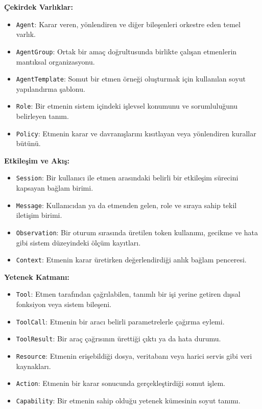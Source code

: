 \documentclass[10pt, a4paper, twocolumn]{article}
\begin{document}
\textbf{Çekirdek Varlıklar:}
\begin{itemize}
    \item \texttt{Agent}: Karar veren, yönlendiren ve diğer bileşenleri orkestre eden temel varlık.
    \item \texttt{AgentGroup}: Ortak bir amaç doğrultusunda birlikte çalışan etmenlerin mantıksal organizasyonu.
    \item \texttt{AgentTemplate}: Somut bir etmen örneği oluşturmak için kullanılan soyut yapılandırma şablonu.
    \item \texttt{Role}: Bir etmenin sistem içindeki işlevsel konumunu ve sorumluluğunu belirleyen tanım.
    \item \texttt{Policy}: Etmenin karar ve davranışlarını kısıtlayan veya yönlendiren kurallar bütünü.
\end{itemize}

\textbf{Etkileşim ve Akış:}
\begin{itemize}
    \item \texttt{Session}: Bir kullanıcı ile etmen arasındaki belirli bir etkileşim sürecini kapsayan bağlam birimi.
    \item \texttt{Message}: Kullanıcıdan ya da etmenden gelen, role ve sıraya sahip tekil iletişim birimi.
    \item \texttt{Observation}: Bir oturum sırasında üretilen token kullanımı, gecikme ve hata gibi sistem düzeyindeki ölçüm kayıtları.
    \item \texttt{Context}: Etmenin karar üretirken değerlendirdiği anlık bağlam penceresi.
\end{itemize}

\textbf{Yetenek Katmanı:}
\begin{itemize}
    \item \texttt{Tool}: Etmen tarafından çağrılabilen, tanımlı bir işi yerine getiren dışsal fonksiyon veya sistem bileşeni.
    \item \texttt{ToolCall}: Etmenin bir aracı belirli parametrelerle çağırma eylemi.
    \item \texttt{ToolResult}: Bir araç çağrısının ürettiği çıktı ya da hata durumu.
    \item \texttt{Resource}: Etmenin erişebildiği dosya, veritabanı veya harici servis gibi veri kaynakları.
    \item \texttt{Action}: Etmenin bir karar sonucunda gerçekleştirdiği somut işlem.
    \item \texttt{Capability}: Bir etmenin sahip olduğu yetenek kümesinin soyut tanımı.
\end{itemize}
\end{document}
